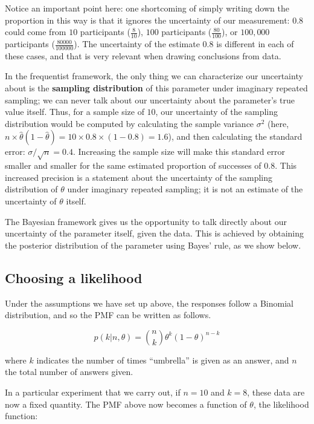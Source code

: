 \documentclass[12pt,]{krantz}
\theoremstyle{definition}
\theoremstyle{definition}
\theoremstyle{definition}
\theoremstyle{remark}
\begin{document}
Notice an important point here: one shortcoming of simply writing down the proportion in this way is that it ignores the uncertainty of our measurement: \(0.8\) could come from \(10\) participants (\(\frac{8}{10}\)), \(100\) participants (\(\frac{80}{100}\)), or \(100,000\) participants (\(\frac{80000}{100000}\)). The uncertainty of the estimate \(0.8\) is different in each of these cases, and that is very relevant when drawing conclusions from data.

In the frequentist framework, the only thing we can characterize our uncertainty about is the \textbf{sampling distribution} of this parameter under imaginary repeated sampling; we can never talk about our uncertainty about the parameter's true value itself.
Thus, for a sample size of \(10\), our uncertainty of the sampling distribution would be computed by calculating the sample variance \(\sigma^2\) (here, \(n\times \hat\theta(1-\hat\theta)= 10\times 0.8 \times (1-0.8)=1.6\)), and then calculating the standard error: \(\sigma/\sqrt{n}=0.4\). Increasing the sample size will make this standard error smaller and smaller for the same estimated proportion of successes of \(0.8\). This increased precision is a statement about the uncertainty of the sampling distribution of \(\theta\) under imaginary repeated sampling; it is not an estimate of the uncertainty of \(\theta\) itself.

The Bayesian framework gives us the opportunity to talk directly about our uncertainty of the parameter itself, given the data. This is achieved by obtaining the posterior distribution of the parameter using Bayes' rule, as we show below.

\hypertarget{choosing-a-likelihood}{%
\subsection{Choosing a likelihood}\label{choosing-a-likelihood}}

Under the assumptions we have set up above, the responses follow a Binomial distribution, and so the PMF can be written as follows.

\begin{equation}
p(k|n,\theta) = \binom{n}
{k} \theta^k (1-\theta)^{n-k}
\label{eq:binom}
\end{equation}

where \(k\) indicates the number of times ``umbrella'' is given as an answer, and \(n\) the total number of answers given.

In a particular experiment that we carry out, if \(n=10\) and \(k = 8\), these data are now a fixed quantity. The PMF above now becomes a function of \(\theta\), the likelihood function:
\end{document}
